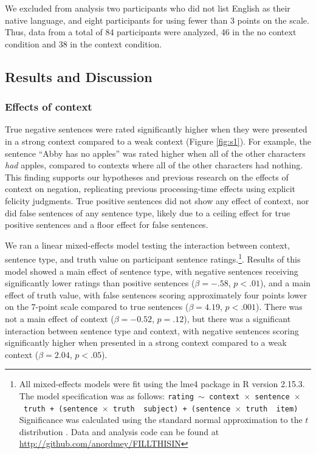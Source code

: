 \documentclass[10pt,letterpaper]{article}
\begin{document}
We excluded from analysis two participants who did not list English as their native language, and eight participants for using fewer than 3 points on the scale.  Thus, data from a total of 84 participants were analyzed, 46 in the no context condition and 38 in the context condition.  

\subsection{Results and Discussion}

\subsubsection{Effects of context}

True negative sentences were rated significantly higher when they were presented in a strong context compared to a weak context (Figure \ref{fig:s1}). For example, the sentence ``Abby has no apples'' was rated higher when all of the other characters \emph{had} apples, compared to contexts where all of the other characters had nothing. This finding supports our hypotheses and previous research on the effects of context on negation, replicating previous processing-time effects using explicit felicity judgments.  True positive sentences did not show any effect of context, nor did false sentences of any sentence type, likely due to a ceiling effect for true positive sentences and a floor effect for false sentences.  

We ran a linear mixed-effects model testing the interaction between context, sentence type, and truth value on participant sentence ratings.\footnote{All mixed-effects models were fit using the lme4 package in R version 2.15.3.  The model specification was as follows: \texttt{rating $\sim$ context~$\times$~sentence~$\times$~truth + (sentence~$\times$~truth~\textbar~subject) +  (sentence~$\times$~truth~\textbar~item)}  Significance was calculated using the standard normal approximation to the $t$ distribution \cite{barr2013}. Data and analysis code can be found at \href{http://github.com/anordmey/FILLTHISIN}{http://github.com/anordmey/FILLTHISIN}}.  Results of this model showed a main effect of sentence type, with negative sentences receiving significantly lower ratings than positive sentences ($\beta= -.58$, $p< .01$), and a main effect of truth value, with false sentences scoring approximately four points lower on the 7-point scale compared to true sentences ($\beta= 4.19$, $p< .001$).  There was not a main effect of context ($\beta= -0.52$, $p=.12$), but there was a significant interaction between sentence type and context, with negative sentences scoring significantly higher when presented in a strong context compared to a weak context ($\beta= 2.04$, $p< .05$).  
\end{document}
